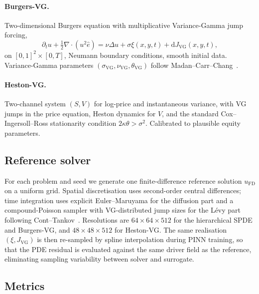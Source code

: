 \documentclass[review,12pt]{elsarticle}
\begin{document}
\paragraph{Burgers-VG.}
Two-dimensional Burgers equation with multiplicative
Variance-Gamma jump forcing,
\begin{equation}
\partial_t u + \tfrac12 \nabla \cdot (u^2 \hat e)
= \nu \Delta u + \sigma \xi(x, y, t)
+ \mathrm dJ_{\mathrm{VG}}(x, y, t),
\label{eq:burgersvg}
\end{equation}
on \([0,1]^2 \times [0, T]\), Neumann boundary conditions, smooth
initial data. Variance-Gamma parameters
\((\sigma_{\mathrm{VG}}, \nu_{\mathrm{VG}}, \theta_{\mathrm{VG}})\)
follow Madan--Carr--Chang~\cite{MadanCarrChang1998}.

\paragraph{Heston-VG.}
Two-channel system \((S, V)\) for log-price and instantaneous
variance, with VG jumps in the price equation, Heston dynamics for
\(V\), and the standard Cox--Ingersoll--Ross stationarity
condition \(2\kappa\theta > \sigma^2\). Calibrated to plausible
equity parameters.

\subsection{Reference solver}

For each problem and seed we generate one finite-difference
reference solution \(u_{\mathrm{FD}}\) on a uniform grid. Spatial
discretisation uses second-order central differences; time
integration uses explicit Euler--Maruyama for the diffusion part
and a compound-Poisson sampler with VG-distributed jump sizes for
the L\'evy part following Cont--Tankov~\cite{ContTankov2003}.
Resolutions are \(64\times 64 \times 512\) for the hierarchical
SPDE and Burgers-VG, and \(48\times 48 \times 512\) for
Heston-VG. The same realisation \((\xi, J_{\mathrm{VG}})\) is then
re-sampled by spline interpolation during PINN training, so that
the PDE residual is evaluated against the same driver field as
the reference, eliminating sampling variability between solver and
surrogate.

\subsection{Metrics}
\label{subsec:metrics}
\end{document}

